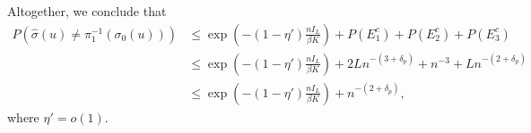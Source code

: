 \documentclass{article}
\begin{document}
Altogether, we conclude that
\begin{align*}
P( \hat{\sigma}(u) \neq \pi_1^{-1} ( \sigma_0(u)) ) &\leq  \exp\left( -(1 - \eta') \frac{n I_L}{\beta K} \right) + P(E_1^c) + P(E_2^c) + P(E_3^c) \\
    &\leq \exp\left( -(1 - \eta') \frac{n I_L}{\beta K} \right) + 2Ln^{-(3 + \delta_p)} + n^{-3} + Ln^{-(2+\delta_p)} \\
    &\leq  \exp\left( -(1 - \eta') \frac{n I_L}{\beta K} \right) + n^{-(2 + \delta_p)},
\end{align*}
where $\eta' = o(1)$.
\end{document}

